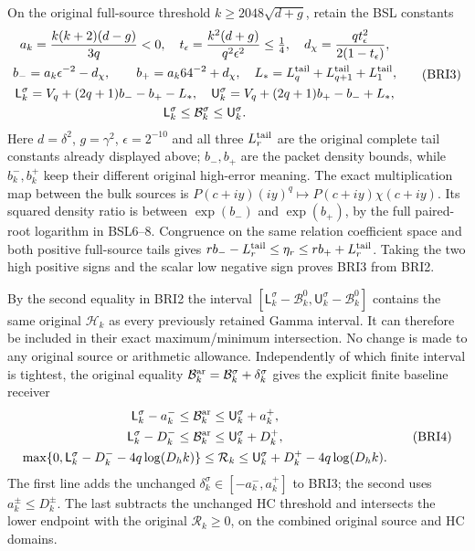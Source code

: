\documentclass[11pt,a4paper]{article}
\begin{document}
On the original full-source threshold
$k\geq2048\sqrt{d+g}$, retain the BSL constants
\[
\begin{gathered}
 a_k=\frac{k(k+2)(d-g)}{3q}<0,\quad
 t_\epsilon=\frac{k^2(d+g)}{q^2\epsilon^2}\leq\tfrac14,
 \quad d_\chi=\frac{qt_\epsilon^2}{2(1-t_\epsilon)},\\
 b_-=a_k\epsilon^{-2}-d_\chi,
 \qquad b_+=a_k64^{-2}+d_\chi,
 \quad L_*=L_q^{\rm tail}+L_{q+1}^{\rm tail}+L_1^{\rm tail},\\
 \mathsf L_k^\sigma=V_q+(2q+1)b_- -b_+-L_*,\quad
 \mathsf U_k^\sigma=V_q+(2q+1)b_+ -b_-+L_*,\\
 \mathsf L_k^\sigma\leq\mathcal B_k^\sigma
                                  \leq\mathsf U_k^\sigma.
\end{gathered}\tag{BRI3}
\]
Here $d=\delta^2$, $g=\gamma^2$, $\epsilon=2^{-10}$ and
all three $L_r^{\rm tail}$ are the original complete tail constants
already displayed above; $b_-,b_+$ are the packet density bounds,
while $b_k^-,b_k^+$ keep their different original high-error meaning.
The exact multiplication map between the bulk sources is
$P(c+iy)(iy)^q\mapsto P(c+iy)\chi(c+iy)$.
Its squared density ratio is between $\exp(b_-)$ and
$\exp(b_+)$, by the full paired-root logarithm in BSL6--8.
Congruence on the same relation coefficient space and both positive
full-source tails gives $rb_- -L_r^{\rm tail}\leq\eta_r
\leq rb_++L_r^{\rm tail}$. Taking the two high positive signs
and the scalar low negative sign proves BRI3 from BRI2.

By the second equality in BRI2 the interval
$[\mathsf L_k^\sigma-\mathcal B_k^0,
\mathsf U_k^\sigma-\mathcal B_k^0]$ contains the same original
$\mathcal H_k$ as every previously retained Gamma interval.
It can therefore be included in their exact maximum/minimum
intersection. No change is made to any original source or
arithmetic allowance. Independently of which finite interval is
tightest, the original equality
$\mathcal B_k^{\rm ar}=\mathcal B_k^\sigma+\delta_k^\sigma$
gives the explicit finite baseline receiver
\[
\begin{gathered}
 \mathsf L_k^\sigma-a_k^-\leq\mathcal B_k^{\rm ar}
                                   \leq\mathsf U_k^\sigma+a_k^+,\\
 \mathsf L_k^\sigma-D_k^-\leq\mathcal B_k^{\rm ar}
                                   \leq\mathsf U_k^\sigma+D_k^+,\\
 \max\{0,\mathsf L_k^\sigma-D_k^- -4q\log(D_hk)\}
 \leq\mathcal R_k
 \leq\mathsf U_k^\sigma+D_k^+ -4q\log(D_hk).
\end{gathered}\tag{BRI4}
\]
The first line adds the unchanged
$\delta_k^\sigma\in[-a_k^-,a_k^+]$ to BRI3; the second
uses $a_k^\pm\leq D_k^\pm$. The last subtracts the unchanged
HC threshold and intersects the lower endpoint with the original
$\mathcal R_k\geq0$, on the combined original source and HC domains.
\end{document}
